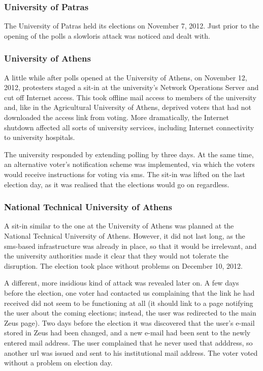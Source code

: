\documentclass[letterpaper,10pt]{article}
\begin{document}
\subsubsection{University of Patras}

The University of Patras held its elections on November 7, 2012. Just
prior to the opening of the polls a slowloris attack was noticed and
dealt with.

\subsubsection{University of Athens}

A little while after polls opened at the University of Athens, on
November 12, 2012, protesters staged a sit-in at the university's
Network Operations Server and cut off Internet access. This took
offline mail access to members of the university and, like in the
Agricultural University of Athens, deprived voters that had not
downloaded the access link from voting. More dramatically, the
Internet shutdown affected all sorts of university services, including
Internet connectivity to university hospitals.

The university responded by extending polling by three days. At the
same time, an alternative voter's notification scheme was implemented,
via which the voters would receive instructions for voting via {\sc sms}.
The sit-in was lifted on the last election day, as it was realised
that the elections would go on regardless.

\subsubsection{National Technical University of Athens}

A sit-in similar to the one at the University of Athens was planned at
the National Technical University of Athens. However, it did not last
long, as the {\sc sms}-based infrastructure was already in place, so
that it would be irrelevant, and the university authorities made it
clear that they would not tolerate the disruption. The election took
place without problems on December 10, 2012.

A different, more insidious kind of attack was revealed later on. A
few days before the election, one voter had contacted us complaining
that the link he had received did not seem to be functioning at all
(it should link to a page notifying the user about the coming
elections; instead, the user was redirected to the main Zeus page).
Two days before the election it was discovered that the user's e-mail
stored in Zeus had been changed, and a new e-mail had been sent to the
newly entered mail address. The user complained that he never used
that adddress, so another {\sc url} was issued and sent to his institutional
mail address. The voter voted without a problem on election day.
\end{document}
